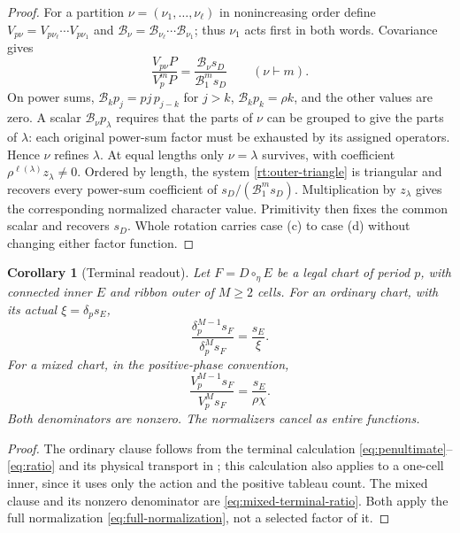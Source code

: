 \documentclass[11pt,a4paper]{amsart}
\numberwithin{equation}{section}
\theoremstyle{plain}
\newtheorem{corollary}[theorem]{Corollary}
\theoremstyle{definition}
\begin{document}
\begin{proof}
For a partition \(\nu=(\nu_1,\ldots,\nu_\ell)\) in nonincreasing order define
\(V_{p\nu}=V_{p\nu_\ell}\cdots V_{p\nu_1}\) and
\(\mathcal B_\nu=\mathcal B_{\nu_\ell}\cdots\mathcal B_{\nu_1}\); thus \(\nu_1\) acts first in both words.  Covariance gives
\begin{equation}\label{rt:outer-triangle}
 \frac{V_{p\nu}P}{V_p^mP}
 =\frac{\mathcal B_\nu s_D}{\mathcal B_1^m s_D}
 \qquad(\nu\vdash m).
\end{equation}
On power sums, \(\mathcal B_kp_j=pj\,p_{j-k}\) for \(j>k\),
\(\mathcal B_kp_k=\rho k\), and the other values are zero.  A scalar
\(\mathcal B_\nu p_\lambda\) requires that the parts of \(\nu\) can be grouped to give the parts of \(\lambda\): each original power-sum factor must be exhausted by its assigned operators.  Hence \(\nu\) refines \(\lambda\).  At equal lengths only \(\nu=\lambda\) survives, with coefficient
\(\rho^{\ell(\lambda)}z_\lambda\ne0\).  Ordered by length, the system \eqref{rt:outer-triangle} is triangular and recovers every power-sum coefficient of \(s_D/(\mathcal B_1^m s_D)\).  Multiplication by \(z_\lambda\) gives the corresponding normalized character value.  Primitivity then fixes the common scalar and recovers \(s_D\).  Whole rotation carries case (c) to case (d) without changing either factor function.
\end{proof}

\begin{corollary}[Terminal readout]\label{lem:terminal-readout}
Let \(F=D\circ_\eta E\) be a legal chart of period \(p\), with connected inner \(E\) and ribbon outer of \(M\ge2\) cells.  For an ordinary chart, with its actual \(\xi=\delta_p s_E\),
\begin{equation}\label{eq:ordinary-readout}
 \frac{\delta_p^{M-1}s_F}{\delta_p^M s_F}=\frac{s_E}{\xi}.
\end{equation}
For a mixed chart, in the positive-phase convention,
\begin{equation}\label{eq:mixed-readout}
 \frac{V_p^{M-1}s_F}{V_p^M s_F}=\frac{s_E}{\rho\chi}.
\end{equation}
Both denominators are nonzero.  The normalizers cancel as entire functions.
\end{corollary}
\begin{proof}
The ordinary clause follows from the terminal calculation \eqref{eq:penultimate}--\eqref{eq:ratio} and its physical transport in ; this calculation also applies to a one-cell inner, since it uses only the action and the positive tableau count.  The mixed clause and its nonzero denominator are \eqref{eq:mixed-terminal-ratio}.  Both apply the full normalization \eqref{eq:full-normalization}, not a selected factor of it.
\end{proof}
\end{document}
